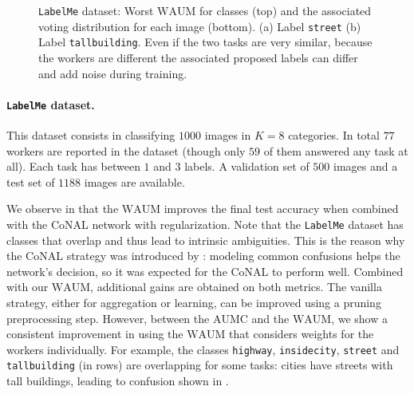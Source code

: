 \begin{figure}[t]
    \label{fig:labelme_worstWAUM}%
    \centering
    \hfill
    \hfill
    \caption{\texttt{LabelMe} dataset: Worst $\mathrm{WAUM}$ for classes (top) and the associated voting distribution for each image (bottom). (a) Label \texttt{street} (b)  Label \texttt{tallbuilding}.
        Even if the two tasks are very similar, because the workers are different the associated proposed labels can differ and add noise during training.}
\end{figure}

\paragraph{\texttt{LabelMe} dataset.} This dataset consists in classifying $1000$ images in $K=8$ categories.
In total $77$ workers are reported in the dataset (though only $59$ of them answered any task at all).
Each task has between $1$ and $3$ labels. A validation set of $500$ images and a test set of $1188$ images are available.

We observe in  that the $\mathrm{WAUM}$ improves the final test accuracy when combined with the CoNAL network with regularization.
Note that the \texttt{LabelMe} dataset has classes that overlap and thus lead to intrinsic ambiguities.
This is the reason why the CoNAL strategy was introduced by \citet{chu2021learning}: modeling common confusions helps the network's decision, so it was expected for the CoNAL to perform well.
Combined with our $\mathrm{WAUM}$, additional gains are obtained on both metrics.
The vanilla strategy, either for aggregation or learning, can be improved using a pruning preprocessing step.
However, between the $\mathrm{AUMC}$ and the $\mathrm{WAUM}$, we show a consistent improvement in using the $\mathrm{WAUM}$ that considers weights for the workers individually.
For example, the classes \texttt{highway}, \texttt{insidecity}, \texttt{street} and \texttt{tallbuilding} (in rows) are overlapping for some tasks: cities have streets with tall buildings, leading to confusion shown in .

